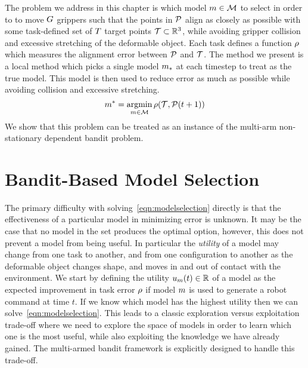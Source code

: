 The problem we address in this chapter is which model $m \in \mathcal{M}$ to select in order to to move $G$ grippers such that the points in $\mathcal{P}$ align as closely as possible with some task-defined set of $T$ target points $\mathcal{T} \subset \mathbb{R}^3$, while avoiding gripper collision and excessive stretching of the deformable object. Each task defines a function $\rho$ which measures the alignment error between $\mathcal{P}$ and $\mathcal{T}$. The method we present is a local method which picks a single model $m_{*}$ at each timestep to treat as the true model. This model is then used to reduce error as much as possible while avoiding collision and excessive stretching. 
\begin{equation}
    m^* = \operatorname*{argmin}_{m \in \mathcal{M}} \rho(\mathcal{T}, \mathcal{P}(t+1))
    \label{eqn:modelselection}
\end{equation}
We show that this problem can be treated as an instance of the multi-arm non-stationary dependent bandit problem.


\section{Bandit-Based Model Selection}

The primary difficulty with solving~\eqref{eqn:modelselection} directly is that the effectiveness of a particular model in minimizing error is unknown. It may be the case that no model in the set produces the optimal option, however, this does not prevent a model from being useful. In particular the \textit{utility} of a model may change from one task to another, and from one configuration to another as the deformable object changes shape, and moves in and out of contact with the environment. We start by defining the utility $u_m(t) \in \mathbb{R}$ of a model as the expected improvement in task error $\rho$ if model $m$ is used to generate a robot command at time $t$. If we know which model has the highest utility then we can solve~\eqref{eqn:modelselection}. This leads to a classic exploration versus exploitation trade-off where we need to explore the space of models in order to learn which one is the most useful, while also exploiting the knowledge we have already gained.  The multi-armed bandit framework is explicitly designed to handle this trade-off.


